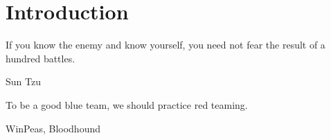 \documentclass{article}
\begin{document}
\graphicspath{ {./Images/} }
\tableofcontents

\section{Introduction}
\epigraph{If you know the enemy and know yourself, you need not fear the result of a hundred battles.}{Sun Tzu}

To be a good blue team, we should practice red teaming.

WinPeas, Bloodhound

\section{}
\end{document}
